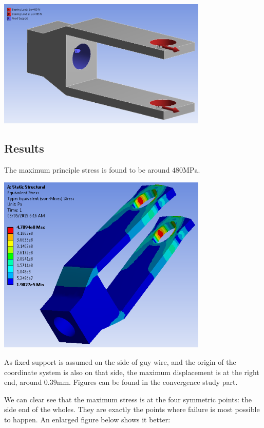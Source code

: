 \documentclass[a4paper,14pt]{extarticle}
\begin{document}
\begin{center}\includegraphics[width=0.75\textwidth]{Model.PNG}\end{center}
\subsection{Results}
The maximum principle stress is found to be around $480\si{\mega\pascal}$.

\begin{center}\includegraphics[width=0.75\textwidth]{STRESS_DEFAULT.PNG}\end{center}

As fixed support is assumed on the side of guy wire, and the origin of the coordinate system is also on that side, the maximum displacement is at the right end, around $0.39 \si{\milli\meter}$. Figures can be found in the convergence study part.

We can clear see that the maximum stress is at the four symmetric points: the side end of the wholes. They are exactly the points where failure is most possible to happen.  An enlarged figure below shows it better:
\end{document}
